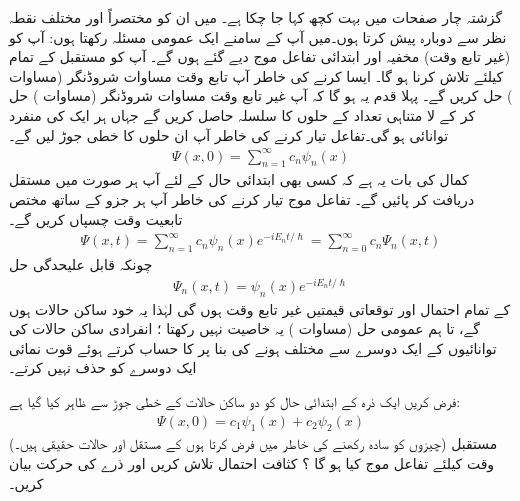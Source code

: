 گزشتہ چار صفحات میں  بہت کچھ کہا جا چکا ہے۔ میں ان کو مختصراً اور مختلف نقطہ نظر سے دوبارہ پیش کرتا ہوں۔میں آپ کے سامنے ایک عمومی مسئلہ رکھتا ہوں: آپ کو   (غیر تابع وقت)  مخفیہ   اور ابتدائی تفاعل موج  دیے گئے ہوں گے۔ آپ کو مستقبل کے تمام  کیلئے  تلاش کرنا ہو گا۔ ایسا کرنے کی خاطر آپ تابع وقت مساوات شروڈنگر (مساوات ) حل کریں گے۔ پہلا قدم یہ ہو گا کہ  آپ غیر تابع وقت مساوات شروڈنگر (مساوات ) حل کر کے لا متناہی تعداد کے حلوں کا سلسلہ  حاصل کریں گے جہاں ہر ایک
 کی منفرد توانائی  ہو گی۔تفاعل  تیار کرنے کی خاطر آپ ان حلوں کا خطی جوڑ لیں گے۔
\begin{align}\label{مساوات_شروڈنگر_ساکن_حالات_کا_خطی_جوڑ}
\Psi (x,0) = \sum_{n=1}^{\infty} c_{n} \psi_{n}(x)
\end{align}
کمال کی بات یہ ہے کہ کسی بھی ابتدائی حال کے لئے آپ ہر صورت میں  مستقل  دریافت کر پائیں گے۔ تفاعل موج  تیار کرنے کی خاطر آپ ہر جزو کے ساتھ مختص تابعیت وقت  چسپاں کریں گے۔ 
\begin{align}\label{مساوات_شروڈنگر_عمومی_حل_مجموعہ}
\Psi (x,t) = \sum_{n=1}^{\infty} c_{n} \psi_{n}(x)e^{-iE_{n}t/\hslash} = \sum_{n=0}^{\infty} c_{n} \Psi_{n} (x,t)
\end{align}
چونکہ قابل علیحدگی حل
\begin{align}\label{مساوات_شروڈنگر_تمام_عمومی_حل}
\Psi_{n} (x,t) = \psi_{n}(x) e^{-iE_{n}t/\hslash}
\end{align}
کے تمام احتمال اور توقعاتی قیمتیں غیر تابع وقت ہوں گی لہٰذا یہ خود ساکن حالات ہوں گے، تا ہم عمومی حل (مساوات ) یہ خاصیت نہیں رکھتا ؛ انفرادی ساکن حالات کی توانائیوں کے  ایک دوسرے سے مختلف ہونے کی بنا پر   کا حساب کرتے ہوئے قوت نمائی ایک دوسرے کو حذف نہیں کرتے۔ 


فرض کریں ایک ذرہ کے  ابتدائی حال کو  دو ساکن حالات کے خطی جوڑ   سے ظاہر کیا گیا ہے: 
\begin{align*}
\Psi (x,0) = c_{1} \psi_{1}(x) + c_{2} \psi_{2}(x) 
\end{align*}
(چیزوں کو سادہ رکھنے کی خاطر میں فرض کرتا ہوں کے مستقل  اور حالات  حقیقی ہیں۔) مستقبل وقت   کیلئے تفاعل موج  کیا ہو گا ؟ کثافت احتمال تلاش کریں اور ذرے کی حرکت بیان کریں۔ 

